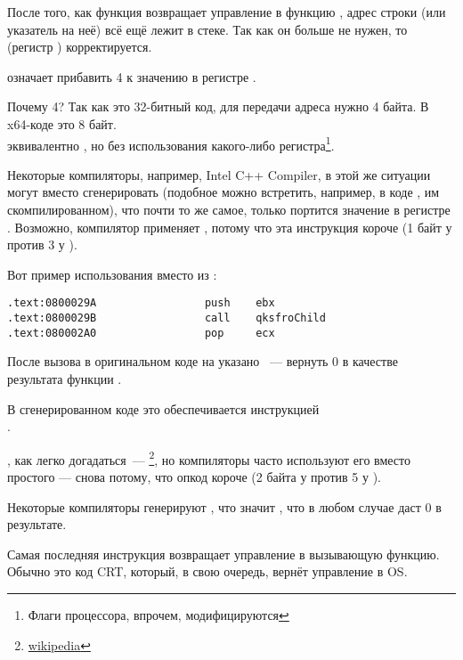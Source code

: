 После того, как функция \printf возвращает управление в функцию \main, адрес строки (или указатель на неё) всё ещё лежит в стеке.
Так как он больше не нужен, то  (регистр \ESP) корректируется.

 означает прибавить 4 к значению в регистре \ESP.

Почему 4? Так как это 32-битный код, для передачи адреса нужно 4 байта. В x64-коде это 8 байт.\\
 эквивалентно , но без использования какого-либо регистра\footnote{Флаги процессора, впрочем, модифицируются}.

\myindex{\oracle}

Некоторые компиляторы, например, Intel C++ Compiler, в этой же ситуации могут вместо 
\ADD сгенерировать  (подобное можно встретить, например, в коде \oracle{}, им скомпилированном),
что почти то же самое, только портится значение в регистре \ECX.
Возможно, компилятор применяет , потому что эта инструкция короче (1 байт у  против 3 у ).

Вот пример использования \POP вместо \ADD из \oracle{}:

\begin{lstlisting}[caption=\oracle 10.2 Linux (файл app.o)]
.text:0800029A                 push    ebx
.text:0800029B                 call    qksfroChild
.text:080002A0                 pop     ecx
\end{lstlisting}

После вызова \printf в оригинальном коде на \CCpp указано ~--- вернуть 0 в качестве результата функции \main.

В сгенерированном коде это обеспечивается инструкцией \\
.


\XOR, как легко догадаться~--- \footnote{\href{http://go.yurichev.com/17118}{wikipedia}}, но компиляторы часто используют его вместо простого
 --- снова потому, что опкод короче (2 байта у \XOR против 5 у \MOV).

Некоторые компиляторы генерируют , что значит  \EAX {}\EAX, что в любом случае даст 0 в результате.

Самая последняя инструкция \RET возвращает управление в вызывающую функцию. Обычно это код \CCpp \ac{CRT}, который, в свою очередь, вернёт управление в \ac{OS}.

